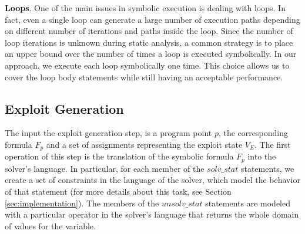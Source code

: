 \noindent
\textbf{Loops}. One of the main issues in symbolic execution is dealing with loops. In fact, even a single loop can generate a large number of execution paths depending on different number of iterations and paths inside the loop. Since the number of loop iterations is unknown during static analysis, a common strategy is to place an upper bound over the number of times a loop is executed symbolically. In our approach, we execute each loop symbolically one time. This choice allows us to cover the loop body statements while still having an acceptable performance.













\subsection{Exploit Generation}
The input the exploit generation step, is a program point $p$, the corresponding formula $F_p$ and a set of assignments representing the exploit state $V_E$. The first operation of this step is the translation of the symbolic formula $F_p$ into the solver's language. In particular, for each member of the $solv\_stat$ statements, we create a set of constraints in the language of the solver, which model the behavior of that statement (for more details about this task, see Section \ref{sec:implementation}). The members of the $unsolv\_stat$ statements are modeled with a particular operator in the solver's language that returns the whole domain of values for the variable.



